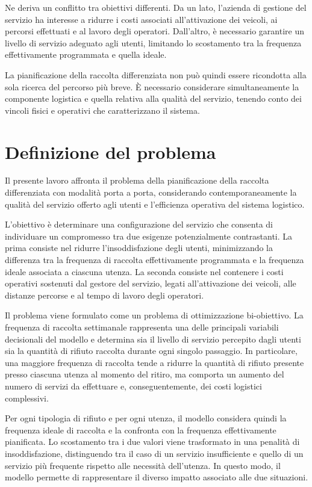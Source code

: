 Ne deriva un conflitto tra obiettivi differenti. Da un lato, l'azienda di gestione del servizio ha interesse a ridurre i costi associati all'attivazione dei veicoli, ai percorsi effettuati e al lavoro degli operatori. Dall'altro, è necessario garantire un livello di servizio adeguato agli utenti, limitando lo scostamento tra la frequenza effettivamente programmata e quella ideale.

La pianificazione della raccolta differenziata non può quindi essere ricondotta alla sola ricerca del percorso più breve. È necessario considerare simultaneamente la componente logistica e quella relativa alla qualità del servizio, tenendo conto dei vincoli fisici e operativi che caratterizzano il sistema.


\section{Definizione del problema}

Il presente lavoro affronta il problema della pianificazione della raccolta differenziata con modalità porta a porta, considerando contemporaneamente la qualità del servizio offerto agli utenti e l'efficienza operativa del sistema logistico.

L'obiettivo è determinare una configurazione del servizio che consenta di individuare un compromesso tra due esigenze potenzialmente contrastanti. La prima consiste nel ridurre l'insoddisfazione degli utenti, minimizzando la differenza tra la frequenza di raccolta effettivamente programmata e la frequenza ideale associata a ciascuna utenza. La seconda consiste nel contenere i costi operativi sostenuti dal gestore del servizio, legati all'attivazione dei veicoli, alle distanze percorse e al tempo di lavoro degli operatori.

Il problema viene formulato come un problema di ottimizzazione bi-obiettivo. La frequenza di raccolta settimanale rappresenta una delle principali variabili decisionali del modello e determina sia il livello di servizio percepito dagli utenti sia la quantità di rifiuto raccolta durante ogni singolo passaggio. In particolare, una maggiore frequenza di raccolta tende a ridurre la quantità di rifiuto presente presso ciascuna utenza al momento del ritiro, ma comporta un aumento del numero di servizi da effettuare e, conseguentemente, dei costi logistici complessivi.

Per ogni tipologia di rifiuto e per ogni utenza, il modello considera quindi la frequenza ideale di raccolta e la confronta con la frequenza effettivamente pianificata. Lo scostamento tra i due valori viene trasformato in una penalità di insoddisfazione, distinguendo tra il caso di un servizio insufficiente e quello di un servizio più frequente rispetto alle necessità dell'utenza. In questo modo, il modello permette di rappresentare il diverso impatto associato alle due situazioni.

